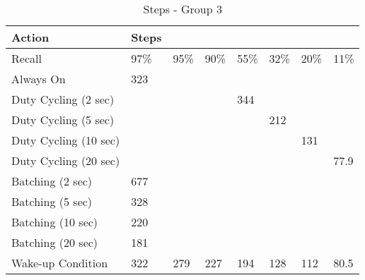 \begin{table*}[t]
    \begin{tabular}{|l|l|l|l|l|l|l|l|}
    \hline
    Action                & Steps & ~   & ~   & ~   & ~   & ~   & ~    \\ \hline
    Recall                & 97\%  & 95\% & 90\% & 55\% & 32\% & 20\% & 11\% \\ \hline
    Always On             & 323   & ~   & ~   & ~   & ~   & ~   & ~    \\ \hline
    Duty Cycling (2 sec)  & ~     & ~   & ~   & 344 & ~   & ~   & ~    \\ \hline
    Duty Cycling (5 sec)  & ~     & ~   & ~   & ~   & 212 & ~   & ~    \\ \hline
    Duty Cycling (10 sec) & ~     & ~   & ~   & ~   & ~   & 131 & ~    \\ \hline
    Duty Cycling (20 sec) & ~     & ~   & ~   & ~   & ~   & ~   & 77.9 \\ \hline
    Batching (2 sec)      & 677   & ~   & ~   & ~   & ~   & ~   & ~    \\ \hline
    Batching (5 sec)      & 328   & ~   & ~   & ~   & ~   & ~   & ~    \\ \hline
    Batching (10 sec)     & 220   & ~   & ~   & ~   & ~   & ~   & ~    \\ \hline
    Batching (20 sec)     & 181   & ~   & ~   & ~   & ~   & ~   & ~    \\ \hline
    Wake-up Condition     & 322   & 279 & 227 & 194 & 128 & 112 & 80.5 \\ \hline
    \end{tabular}
	\caption{Steps - Group 3}
	\label{table:powerProfileNexus}
\end{table*}


